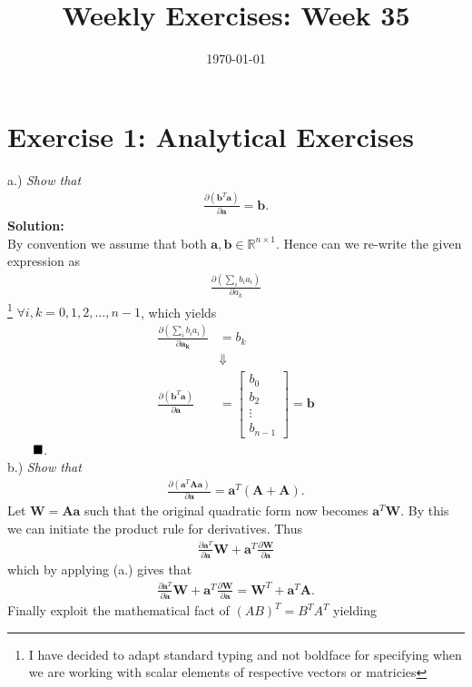 \documentclass[12pt,
               a4paper,
               article,
               oneside,
               norsk,oldfontcommands]{memoir}
\date{\today}
\title{Weekly Exercises: Week 35}
\newcommand{\Q}{ \qquad \hfill \blacksquare}
\newcommand{\R}{\mathbb{R}}
\newcommand{\spaze}{\vspace{4mm}\\}
\begin{document}
\header{}
\section*{ \centering Exercise 1: Analytical Exercises}
a.) \emph{Show that}
\begin{align*}
\frac{\partial (\mathbf{b}^T \mathbf{a})}{\partial \mathbf{a}} = \mathbf{b}.
\end{align*}
\textbf{Solution:} \spaze 
By convention we assume that both $\mathbf{a},\mathbf{b} \in \R^{n \times 1}$. Hence can we re-write the given expression as 
\begin{align*}
\frac{\partial \left( \sum_{i} b_i a_i \right)}{\partial a_k}
\end{align*}
\footnote{I have decided to adapt standard typing and not boldface for specifying when we are working with scalar elements of respective vectors or matricies}
$ \forall i,k = 0, 1, 2, \ldots, n-1$, which yields 
\begin{align*}
\frac{\partial \left( \sum_{i} b_i a_i \right)}{\partial \mathbf{a_k}}  &= b_k \\[5pt] & \Downarrow \\[5pt]
\frac{\partial (\mathbf{b}^T \mathbf{a})}{\partial \mathbf{a}} &= \begin{bmatrix} b_0 \\ b_2 \\ \vdots \\ b_{n-1} \end{bmatrix} = \mathbf{b} 
\end{align*}
$\Q$. \spaze 
b.) \emph{Show that} 
\begin{align*}
\frac{\partial (\mathbf{a}^T \mathbf{A} \mathbf{a})}{\partial \mathbf{a}} = \mathbf{a}^T( \mathbf{A} + \mathbf{A}).
\end{align*}
Let $\mathbf{W} = \mathbf{A} \mathbf{a} $ such that the original quadratic form now becomes $  \mathbf{a}^T  \mathbf{W}$. By this we can initiate the product rule for derivatives. Thus 
\begin{align*}
\frac{\partial \mathbf{a}^T}{\partial \mathbf{a}} \mathbf{W} + \mathbf{a}^T \frac{\partial \mathbf{W}}{\partial \mathbf{a}}
\end{align*}
which by applying (a.) gives that 
\begin{align*}
\frac{\partial \mathbf{a}^T}{\partial \mathbf{a}} \mathbf{W} + \mathbf{a}^T \frac{\partial \mathbf{W}}{\partial \mathbf{a}} = \mathbf{W}^T + \mathbf{a}^T\mathbf{A}.
\end{align*}
Finally exploit the mathematical fact of $ \boxed{(AB)^T = B^TA^T}$ yielding 
\end{document}
